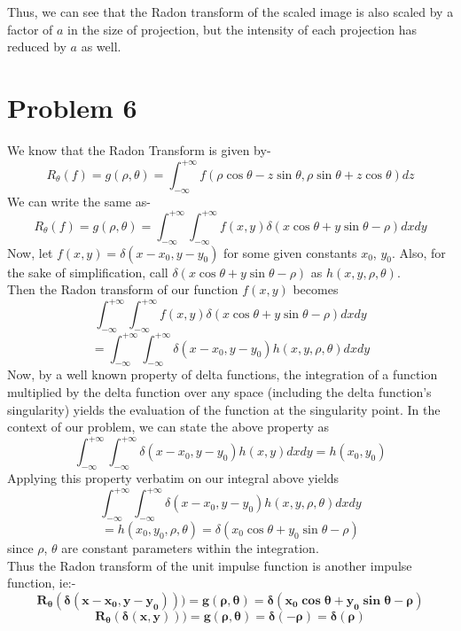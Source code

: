 \documentclass[a4paper,11pt]{article}
\numberwithin{definition}{section}
\numberwithin{mytheorem}{subsection}
\begin{document}
Thus, we can see that the Radon transform of the scaled image is also scaled by a factor of $a$ in the size of projection, but the intensity of each projection has reduced by $a$ as well.
 








\section{Problem 6}

We know that the Radon Transform is given by-
$$R_\theta(f) =g(\rho, \theta)= \int_{-\infty}^{+\infty}f(\rho \cos\theta - z\sin\theta,\rho \sin \theta + z \cos\theta)dz $$
We can write the same as-
$$R_\theta(f) =g(\rho, \theta)= \int_{-\infty}^{+\infty}\int_{-\infty}^{+\infty}f(x,y)\delta(x\cos\theta+y\sin\theta -\rho)dxdy $$
Now, let $f(x, y) = \delta(x-x_0, y-y_0)$ for some given constants $x_0$, $y_0$. Also, for the sake of simplification, call $\delta(x\cos\theta+y\sin\theta -\rho)$ as $h(x, y, \rho, \theta)$.\\
Then the Radon transform of our function $f(x,y)$ becomes
$$\int_{-\infty}^{+\infty}\int_{-\infty}^{+\infty}f(x,y)\delta(x\cos\theta+y\sin\theta -\rho)dxdy$$
$$ = \int_{-\infty}^{+\infty}\int_{-\infty}^{+\infty}\delta(x-x_0, y-y_0)h(x,y,\rho,\theta)dxdy$$
Now, by a well known property of delta functions, the integration of a function multiplied by the delta function over any space (including the delta function's singularity) yields the evaluation of the function at the singularity point. In the context of our problem, we can state the above property as 
$$\int_{-\infty}^{+\infty}\int_{-\infty}^{+\infty}\delta(x-x_0, y-y_0)h(x,y)dxdy = h(x_0, y_0)$$
Applying this property verbatim on our integral above yields
$$\int_{-\infty}^{+\infty}\int_{-\infty}^{+\infty}\delta(x-x_0, y-y_0)h(x,y,\rho,\theta)dxdy$$
$$ = h(x_0, y_0, \rho, \theta) = \delta(x_0\cos\theta+y_0\sin\theta -\rho)$$
since $\rho$, $\theta$ are constant parameters within the integration.\\
Thus the Radon transform of the unit impulse function is another impulse function, ie:-
$$\boldsymbol{R_{\theta}(\delta(x-x_0, y-y_0))) = g(\rho, \theta) = \delta(x_0\cos\theta+y_0\sin\theta -\rho)}$$
$$\boldsymbol{R_{\theta}(\delta(x, y))) = g(\rho, \theta) = \delta(-\rho) = \delta(\rho)}$$
\end{document}
